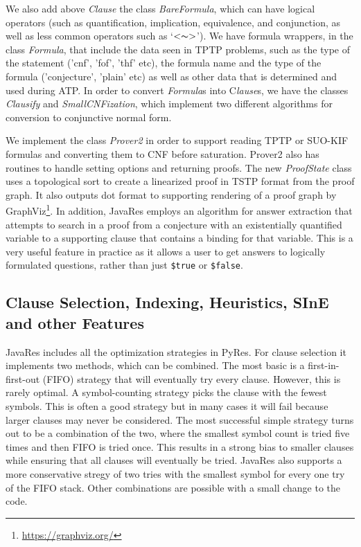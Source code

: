 \documentclass{llncs}
\begin{document}
We also add above \emph{Clause} the class \emph{BareFormula}, which can have
logical operators (such as quantification, implication, equivalence,
and conjunction, as well as less common operators such as
`$<\thicksim>$').  We have formula wrappers, in the class \emph{Formula},
that include the data seen in TPTP problems, such as the type of the
statement ('cnf', 'fof', 'thf' etc), the formula name and the type of
the formula ('conjecture', 'plain' etc) as well as other data that is
determined and used during ATP. In order to convert \emph{Formula}s into
C\emph{lause}s, we have the classes \emph{Clausify} and \emph{SmallCNFization}, which
implement two different algorithms for conversion to conjunctive normal
form.

We implement the class \emph{Prover2} in order to support reading TPTP or
SUO-KIF formulas and converting them to CNF before saturation.
Prover2 also has routines to handle setting options and returning
proofs.  The new \emph{ProofState} class uses a topological sort
\cite{DBLP:journals/cacm/Kahn62} to create a linearized proof in TSTP
format from the proof graph.  It also outputs dot format to supporting
rendering of a proof graph by GraphViz\footnote{\url{https://graphviz.org/}}.
In addition, JavaRes employs an
algorithm for answer extraction that attempts to search in a proof from
a conjecture with an existentially quantified variable to a supporting
clause that contains a binding for that variable.  This is a very useful
feature in practice as it allows a user to get answers to logically
formulated questions, rather than just \texttt{\$true} or \texttt{\$false}.

\subsection{Clause Selection, Indexing, Heuristics, SInE and other Features}

JavaRes includes all the optimization strategies in PyRes.  For clause
selection it implements two methods, which can be combined.  The most
basic is a first-in-first-out (FIFO) strategy that will eventually try every
clause.  However, this is rarely optimal.  A symbol-counting strategy
picks the clause with the fewest symbols.  This is often a good
strategy but in many cases it will fail because larger clauses may
never be considered.  The most successful simple strategy turns out to
be a combination of the two, where the smallest symbol count is tried
five times and then FIFO is tried once.  This results in a strong bias
to smaller clauses while ensuring that all clauses will eventually be
tried.  JavaRes also supports a more conservative stregy of two tries
with the smallest symbol for every one try of the FIFO stack.  Other
combinations are possible with a small change to the code.
\end{document}
